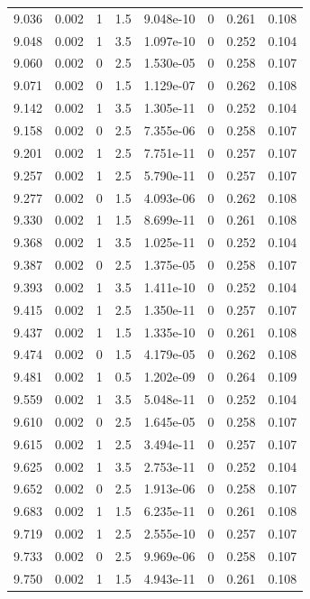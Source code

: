 \documentclass[preview]{standalone}
\begin{document}
{{{{{{{\begin{tabular}{L{1.2cm}C{1.2cm} C{0.3cm}C{0.5cm} C{1.4cm}C{1.4cm} C{1.4cm}C{1.4cm}}
  9.036  &  0.002  & 1     & 1.5 &  9.048e-10  & 0  & 0.261 &  0.108   \\ 
  9.048  &  0.002  & 1     & 3.5 &  1.097e-10  & 0  & 0.252 &  0.104   \\ 
  9.060  &  0.002  & 0     & 2.5 &  1.530e-05  & 0  & 0.258 &  0.107   \\ 
  9.071  &  0.002  & 0     & 1.5 &  1.129e-07  & 0  & 0.262 &  0.108   \\ 
  9.142  &  0.002  & 1     & 3.5 &  1.305e-11  & 0  & 0.252 &  0.104   \\ 
  9.158  &  0.002  & 0     & 2.5 &  7.355e-06  & 0  & 0.258 &  0.107   \\ 
  9.201  &  0.002  & 1     & 2.5 &  7.751e-11  & 0  & 0.257 &  0.107   \\ 
  9.257  &  0.002  & 1     & 2.5 &  5.790e-11  & 0  & 0.257 &  0.107   \\ 
  9.277  &  0.002  & 0     & 1.5 &  4.093e-06  & 0  & 0.262 &  0.108   \\ 
  9.330  &  0.002  & 1     & 1.5 &  8.699e-11  & 0  & 0.261 &  0.108   \\ 
  9.368  &  0.002  & 1     & 3.5 &  1.025e-11  & 0  & 0.252 &  0.104   \\ 
  9.387  &  0.002  & 0     & 2.5 &  1.375e-05  & 0  & 0.258 &  0.107   \\ 
  9.393  &  0.002  & 1     & 3.5 &  1.411e-10  & 0  & 0.252 &  0.104   \\ 
  9.415  &  0.002  & 1     & 2.5 &  1.350e-11  & 0  & 0.257 &  0.107   \\ 
  9.437  &  0.002  & 1     & 1.5 &  1.335e-10  & 0  & 0.261 &  0.108   \\ 
  9.474  &  0.002  & 0     & 1.5 &  4.179e-05  & 0  & 0.262 &  0.108   \\ 
  9.481  &  0.002  & 1     & 0.5 &  1.202e-09  & 0  & 0.264 &  0.109   \\ 
  9.559  &  0.002  & 1     & 3.5 &  5.048e-11  & 0  & 0.252 &  0.104   \\ 
  9.610  &  0.002  & 0     & 2.5 &  1.645e-05  & 0  & 0.258 &  0.107   \\ 
  9.615  &  0.002  & 1     & 2.5 &  3.494e-11  & 0  & 0.257 &  0.107   \\ 
  9.625  &  0.002  & 1     & 3.5 &  2.753e-11  & 0  & 0.252 &  0.104   \\ 
  9.652  &  0.002  & 0     & 2.5 &  1.913e-06  & 0  & 0.258 &  0.107   \\ 
  9.683  &  0.002  & 1     & 1.5 &  6.235e-11  & 0  & 0.261 &  0.108   \\ 
  9.719  &  0.002  & 1     & 2.5 &  2.555e-10  & 0  & 0.257 &  0.107   \\ 
  9.733  &  0.002  & 0     & 2.5 &  9.969e-06  & 0  & 0.258 &  0.107   \\ 
  9.750  &  0.002  & 1     & 1.5 &  4.943e-11  & 0  & 0.261 &  0.108   \\ 
\hline 
\end{tabular} 

}}}}}}}
\end{document}
